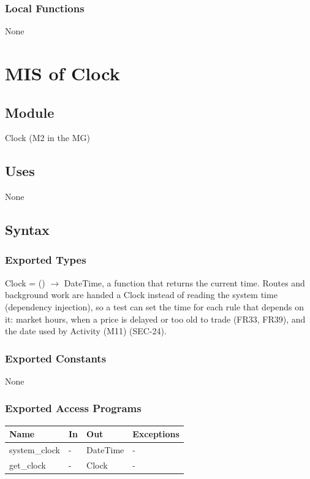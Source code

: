 \documentclass[12pt, titlepage]{article}
\begin{document}
\subsubsection{Local Functions}

None

\newpage

\section{MIS of Clock} \label{MisClock}

\subsection{Module}

Clock (M2 in the MG)

\subsection{Uses}

None

\subsection{Syntax}

\subsubsection{Exported Types}

Clock = () $\rightarrow$ DateTime, a function that returns the current time.
Routes and background work are handed a Clock instead of reading the system
time (dependency injection), so a test can set the time for each rule that
depends on it: market hours, when a price is delayed or too old to trade
(FR33, FR39), and the date used by Activity (M11) (SEC-24).

\subsubsection{Exported Constants}

None

\subsubsection{Exported Access Programs}

\begin{center}
\begin{tabular}{p{3cm} p{2cm} p{3cm} p{3cm}}
\toprule
\textbf{Name} & \textbf{In} & \textbf{Out} & \textbf{Exceptions} \\
\midrule
system\_clock & - & DateTime & - \\
get\_clock & - & Clock & - \\
\bottomrule
\end{tabular}
\end{center}
\end{document}
